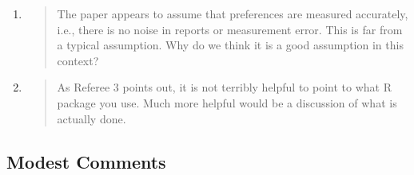 \documentclass[a4paper, 12pt]{scrartcl}
\begin{document}
\begin{enumerate}[label=(\alph*)]
\item \begin{quote}
	The paper appears to assume that preferences are measured accurately, i.e., there is no noise in reports or measurement 	error. This is far from a typical assumption. Why do we think it is a good assumption in this context?
\end{quote}


\item \begin{quote}
	As Referee 3 points out, it is not terribly helpful to point to what R package you use. Much more helpful would be a discussion of what is actually done.
\end{quote}

\end{enumerate}

\subsection*{Modest Comments}




\end{document}
